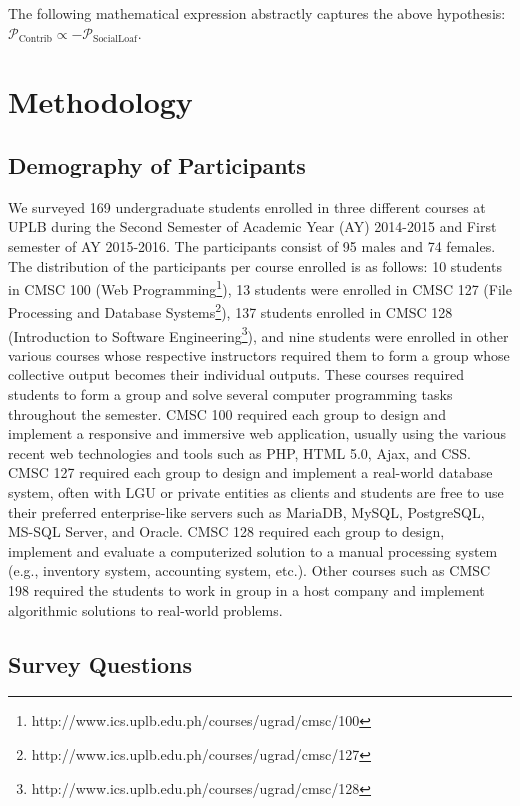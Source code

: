 \documentclass[a4paper,a4paper,BCOR12mm,12pt,abstracton,pointednumbers,tablecaptionabove,footinclude,halfparskip,normalheadings,]{scrartcl}
\newcommand{\PERCEPT}{\mathcal{P}}
\newcommand{\SOCLOAF}{\mathrm{SocialLoaf}}
\newcommand{\CONTRIB}{\mathrm{Contrib}}
\begin{document}
The following mathematical expression abstractly captures the above hypothesis: $\PERCEPT_\CONTRIB \propto -\PERCEPT_\SOCLOAF$.

\section{Methodology}\label{sec:method}

\subsection{Demography of Participants}

We surveyed 169 undergraduate students enrolled in three different courses at UPLB during the Second Semester of Academic Year (AY) 2014-2015 and First semester of AY 2015-2016. The participants consist of 95 males and 74 females. The distribution of the participants per course enrolled is as follows: 10 students in CMSC 100 (Web Programming\footnote{http://www.ics.uplb.edu.ph/courses/ugrad/cmsc/100}), 13 students were enrolled in CMSC 127 (File Processing and Database Systems\footnote{http://www.ics.uplb.edu.ph/courses/ugrad/cmsc/127}), 137 students enrolled in CMSC 128 (Introduction to Software Engineering\footnote{http://www.ics.uplb.edu.ph/courses/ugrad/cmsc/128}), and nine students were enrolled in other various courses whose respective instructors required them to form a group whose collective output becomes their individual outputs. These courses required students to form a group and solve several computer programming tasks throughout the semester. CMSC 100 required each group to design and implement a responsive and immersive web application, usually using the various recent web technologies and tools such as PHP, HTML 5.0, Ajax, and CSS. CMSC 127 required each group to design and implement a real-world database system, often with LGU or private entities as clients and students are free to use their preferred enterprise-like servers such as MariaDB, MySQL, PostgreSQL, MS-SQL Server, and Oracle. CMSC 128  required each group to design, implement and evaluate a computerized solution to a manual processing system (e.g., inventory system, accounting system, etc.). Other courses such as CMSC 198 required the students to work in group in a host company and implement algorithmic solutions to real-world problems. 

\subsection{Survey Questions}
\end{document}
